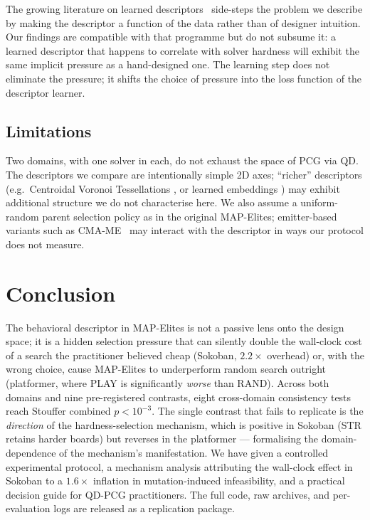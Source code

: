 \documentclass[conference]{IEEEtran}
\begin{document}
The growing literature on learned descriptors~\cite{cully2019autonomous,
grillotti2022unsupervised, paolo2020unsupervised} side-steps the
problem we describe by making the descriptor a function of the data
rather than of designer intuition. Our findings are compatible with
that programme but do not subsume it: a learned descriptor that
happens to correlate with solver hardness will exhibit the same
implicit pressure as a hand-designed one. The learning step does
not eliminate the pressure; it shifts the choice of pressure into
the loss function of the descriptor learner.

\subsection{Limitations}

Two domains, with one solver in each, do not exhaust the space of
PCG via QD. The descriptors we compare are intentionally simple
2D axes; ``richer'' descriptors (e.g.\ Centroidal Voronoi
Tessellations \cite{vassiliades2017cvtmap}, or learned embeddings
\cite{cully2019autonomous}) may exhibit additional structure we do
not characterise here. We also assume a uniform-random parent
selection policy as in the original MAP-Elites; emitter-based
variants such as CMA-ME~\cite{fontaine2020cma} may interact with
the descriptor in ways our protocol does not measure.

\section{Conclusion}
\label{sec:conclusion}

The behavioral descriptor in MAP-Elites is not a passive lens onto
the design space; it is a hidden selection pressure that can
silently double the wall-clock cost of a search the practitioner
believed cheap (Sokoban, $2.2\times$ overhead) or, with the wrong
choice, cause MAP-Elites to underperform random search outright
(platformer, where \textsf{PLAY} is significantly \emph{worse} than
\textsf{RAND}). Across both domains and nine pre-registered
contrasts, eight cross-domain consistency tests reach Stouffer
combined $p < 10^{-3}$. The single contrast that fails to
replicate is the \emph{direction} of the hardness-selection
mechanism, which is positive in Sokoban (\textsf{STR} retains
harder boards) but reverses in the platformer --- formalising the
domain-dependence of the mechanism's manifestation. We have given
a controlled experimental protocol, a mechanism analysis attributing
the wall-clock effect in Sokoban to a $1.6\times$ inflation in
mutation-induced infeasibility, and a practical decision guide
for QD-PCG practitioners. The full code, raw archives, and
per-evaluation logs are released as a replication package.



\end{document}
